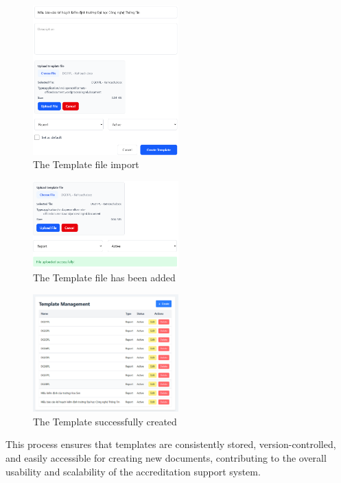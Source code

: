 \begin{figure}[h]
\centering
    \includegraphics[width=0.5\textwidth]{images/adding template.png}
    \caption{The Template file import} 
    \label{fig:template_modal}
\end{figure}

\begin{figure}[h]
\centering
    \includegraphics[width=0.5\textwidth]{images/adding_sucess.png}
    \caption{The Template file  has been added} 
    \label{fig:adding_sucess}
\end{figure}

\begin{figure}[h]
\centering
    \includegraphics[width=0.5\textwidth]{images/template_sucess.png}
    \caption{The Template successfully created} 
    \label{fig:template_sucess}
\end{figure}
This process ensures that templates are consistently stored, version-controlled, and easily accessible for creating new documents, contributing to the overall usability and scalability of the accreditation support system.

